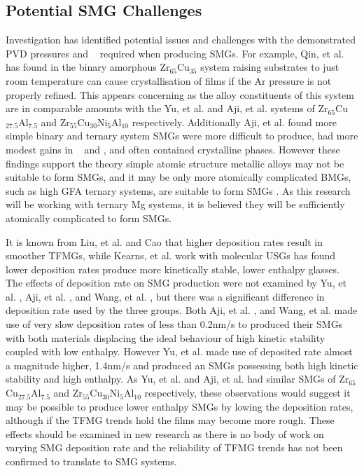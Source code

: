\documentclass[a4paper,12pt,oneside]{report}%
\begin{document}
\subsection{Potential SMG Challenges}
Investigation has identified potential issues and challenges with the demonstrated PVD pressures and \Tsub~ required when producing SMGs. For example, Qin, et al. \cite{Qin2009} has found in the binary amorphous Zr$_{65}$Cu$_{35}$ system raising substrates to just room temperature can cause crystallisation of films if the Ar pressure is not properly refined. This appears concerning as the alloy constituents of this system are in comparable amounts with the Yu, et al. \cite{Yu2013} and Aji, et al. \cite{Aji2013} systems of Zr$_{65}$Cu$_{27.5}$Al$_{7.5}$ and Zr$_{55}$Cu$_{30}$Ni$_{5}$Al$_{10}$ respectively. Additionally Aji, et al. \cite{Aji2013} found more simple binary and ternary system SMGs were more difficult to produce, had more modest gains in \Tg~ and \Tx, and often contained crystalline phases. However these findings support the theory simple atomic structure metallic alloys may not be suitable to form SMGs, and it may be only more atomically complicated BMGs, such as high GFA ternary systems, are suitable to form SMGs \cite{Yu2013}. As this research will be working with ternary Mg systems, it is believed they will be sufficiently atomically complicated to form SMGs. 

It is known from Liu, et al. \cite{Liu2012} and Cao \cite{Cao2013} that higher deposition rates result in smoother TFMGs, while Kearns, et al. \cite{Kearns2008} work with molecular USGs has found lower deposition rates produce more kinetically stable, lower enthalpy  glasses. The effects of deposition rate on SMG production were not examined by Yu, et al. \cite{Yu2013}, Aji, et al. \cite{Aji2013}, and Wang, et al. \cite{Wang2014}, but there was a significant difference in deposition rate used by the three groups. Both Aji, et al. \cite{Aji2013}, and Wang, et al. \cite{Wang2014} made use of very slow deposition rates of less than 0.2nm/s to produced their SMGs with both materials displacing the ideal behaviour of high kinetic stability coupled with low enthalpy. However Yu, et al. \cite{Yu2013} made use of deposited rate almost a magnitude higher, 1.4nm/s and produced an SMGs possessing both high kinetic stability and high enthalpy. As Yu, et al. \cite{Yu2013} and Aji, et al. \cite{Aji2013} had similar SMGs of Zr$_{65}$Cu$_{27.5}$Al$_{7.5}$ and Zr$_{55}$Cu$_{30}$Ni$_{5}$Al$_{10}$ respectively, these observations would suggest it may be possible to produce lower enthalpy SMGs by lowing the deposition rates, although if the TFMG trends hold the films may become more rough. These effects should be examined in new research as there is no body of work on varying SMG deposition rate and the reliability of TFMG trends has not been confirmed to translate to SMG systems. 
\end{document}
